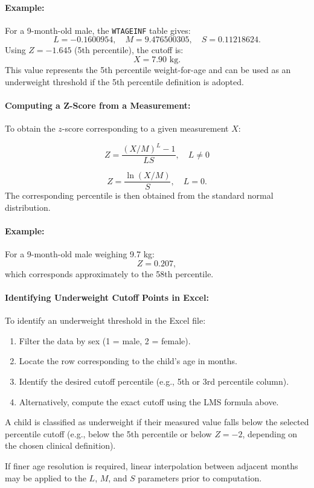\paragraph{Example:}
For a 9-month-old male, the \texttt{WTAGEINF} table gives:
\[
L = -0.1600954, \quad
M = 9.476500305, \quad
S = 0.11218624.
\]
Using $Z = -1.645$ (5th percentile), the cutoff is:
\[
X = 7.90 \text{ kg}.
\]
%
This value represents the 5th percentile weight-for-age and can be used as an underweight threshold if the 5th percentile definition is adopted.
%
\paragraph{Computing a Z-Score from a Measurement:}
%
To obtain the $z$-score corresponding to a given measurement $X$:

\[
Z = \frac{(X/M)^L - 1}{LS}, \quad L \neq 0
\]

\[
Z = \frac{\ln(X/M)}{S}, \quad L = 0.
\]
%
The corresponding percentile is then obtained from the standard normal distribution.
%
\paragraph{Example:}
For a 9-month-old male weighing 9.7 kg:
%
\[
Z = 0.207,
\]
%
which corresponds approximately to the 58th percentile.

\paragraph{Identifying Underweight Cutoff Points in Excel:}
To identify an underweight threshold in the Excel file:
%
\begin{enumerate}
    \item Filter the data by sex (1 = male, 2 = female).
    \item Locate the row corresponding to the child's age in months.
    \item Identify the desired cutoff percentile (e.g., 5th or 3rd percentile column).
    \item Alternatively, compute the exact cutoff using the LMS formula above.
\end{enumerate}
%
A child is classified as underweight if their measured value falls below the selected percentile cutoff (e.g., below the 5th percentile or below $Z=-2$, depending on the chosen clinical definition).

If finer age resolution is required, linear interpolation between adjacent months may be applied to the $L$, $M$, and $S$ parameters prior to computation.

